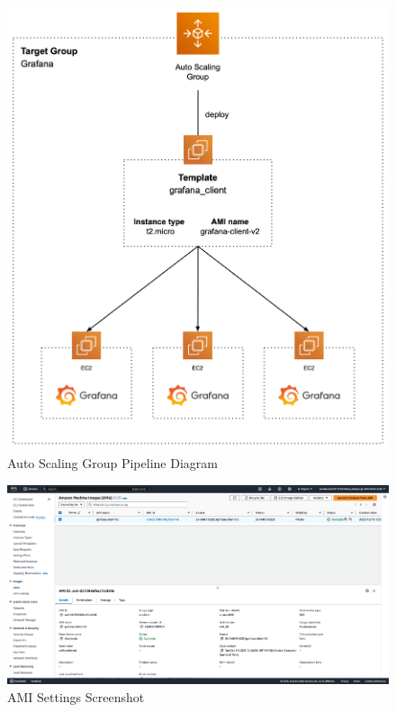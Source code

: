 \documentclass[12pt,oneside]{book} %
\begin{document}
\begin{figure}[H]
    \centering
    \includegraphics[width=1\linewidth]{images/grafana.png}
    \caption{Auto Scaling Group Pipeline Diagram}
\end{figure}

\begin{figure}[H]
    \centering
    \includegraphics[width=1\linewidth]{images/ami.png}
    \caption{AMI Settings Screenshot}
\end{figure}
\end{document}
